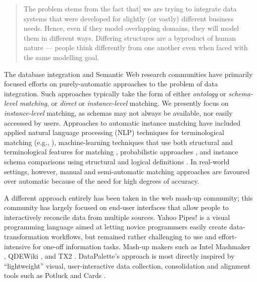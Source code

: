 \documentclass{sigchi}
\begin{document}
\begin{quote} 
  The problem stems from the fact that] we are trying to integrate data systems that were developed for slightly (or vastly) different business needs. Hence, even if they model overlapping domains, they will model them in different ways. Differing structures are a byproduct of human nature --- people think differently from one another even when faced with the same modelling goal. \cite{alonhalevy}
\end{quote}

The database integration and Semantic Web \cite{Shadbolt:2006:SWR:1155313.1155373} research communities have primarily focused efforts on purely-automatic approaches to the problem of data integration.  Such approaches typically take the form of either \emph{ontology} or \emph{schema-level matching}, or \emph{direct} or \emph{instance-level} matching.  We presently focus  on \emph{instance-level} matching, as schemas may not always be available, nor easily accesssed by users. Approaches to automatic instance matching have included applied natural language processing (NLP) techniques for terminological matching (e.g., \cite{euzenat2004api}), machine-learning techniques that use both structural and terminological features for matching \cite{doan2003learning}, probabilistic approaches \cite{suchanek2011paris}, and instance schema comparisons using structural and logical definitions \cite{castano2006matching}.   In real-world settings, however, manual and semi-automatic matching approaches are favoured over automatic because of the need for high degrees of accuracy.  

A different approach entirely has been taken in the web mash-up community; this community has largely focused on end-user interfaces that allow people to interactively reconcile data from multiple sources.  Yahoo Pipes! is a visual programming language aimed at letting novice programmers easily create data-transformation workflows, but remained rather challenging to  use and effort-intensive for one-off information tasks.  Mash-up makers such as Intel Mashmaker \cite{}, QDEWiki \cite{}, and TX2 \cite{}. DataPalette's approach is most directly inspired by ``lightweight'' visual, user-interactive data collection, consolidation and alignment tools such as Potluck \cite{citeulike:3875264} and Cards \cite{Dontcheva:2007:RCS:1294211.1294224}.
\end{document}
